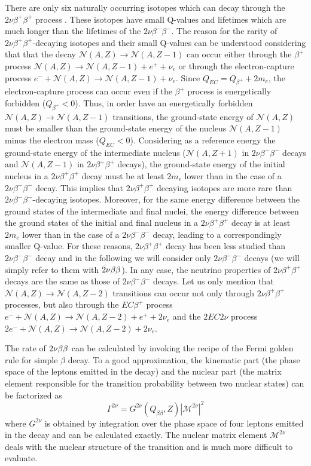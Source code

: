 There are only six naturally occurring isotopes which can decay through the $2\nu\beta^+\beta^+$ process \cite{Haxton:1985am}. These isotopes have small Q-values and lifetimes which are much longer than the lifetimes of the $2\nu\beta^-\beta^-$. The reason for the rarity of $2\nu\beta^+\beta^+$-decaying isotopes and their small Q-values can be understood considering that that the decay $\mathcal{N}(A,Z)\rightarrow\mathcal{N}(A,Z-1)$ can occur either through the $\beta^+$ process $\mathcal{N}(A,Z)\rightarrow\mathcal{N}(A,Z-1)+e^++\nu_e$ or through the electron-capture process $e^-+\mathcal{N}(A,Z)\rightarrow\mathcal{N}(A,Z-1)+\nu_e$. Since $Q_{EC} = Q_{\beta^+}+2m_e$, the electron-capture process can occur even if the $\beta^+$ process is energetically forbidden ($Q_{\beta^+}<0$). Thus, in order have an energetically forbidden $\mathcal{N}(A,Z)\rightarrow\mathcal{N}(A,Z-1)$ transitions, the ground-state energy of $\mathcal{N}(A,Z)$ must be smaller than the ground-state energy of the nucleus $\mathcal{N}(A,Z-1)$ minus the electron mass ($Q_{EC}<0$). Considering as a reference energy the ground-state energy of the intermediate nucleus ($\mathcal{N}(A,Z+1)$ in $2\nu\beta^-\beta^-$ decays and $\mathcal{N}(A,Z-1)$ in $2\nu\beta^+\beta^+$ decays), the ground-state energy of the initial nucleus in a $2\nu\beta^+\beta^+$ decay must be at least $2m_e$ lower than in the case of a $2\nu\beta^-\beta^-$ decay. This implies that $2\nu\beta^+\beta^+$ decaying isotopes are more rare than $2\nu\beta^-\beta^-$-decaying isotopes. Moreover, for the same energy difference between the ground states of the intermediate and final nuclei, the energy difference between the ground states of the initial and final nucleus in a $2\nu\beta^+\beta^+$ decay is at least $2m_e$ lower than in the case of a $2\nu\beta^-\beta^-$ decay, leading to a correspondingly smaller Q-value. For these reasons, $2\nu\beta^+\beta^+$ decay has been less studied than $2\nu\beta^-\beta^-$ decay and in the following we will consider only $2\nu\beta^-\beta^-$ decays (we will simply refer to them with $2\nu\beta\beta$). In any case, the neutrino properties of $2\nu\beta^+\beta^+$ decays are the same as those of $2\nu\beta^-\beta^-$ decays. Let us only mention that $\mathcal{N}(A,Z)\rightarrow\mathcal{N}(A,Z-2)$ transitions can occur not only through $2\nu\beta^+\beta^+$ processes, but also through the $EC\beta^+$ process $e^-+\mathcal{N}(A,Z)\rightarrow\mathcal{N}(A,Z-2)+e^++2\nu_e$ and the $2EC2\nu$ process $2e^-+\mathcal{N}(A,Z)\rightarrow\mathcal{N}(A,Z-2)+2\nu_e$.

The rate of $2\nu\beta\beta$ can be calculated by invoking the recipe of the Fermi golden rule for simple $\beta$ decay. To a good approximation, the kinematic part (the phase space of the leptons emitted in the decay) and the nuclear part (the matrix element responsible for the transition probability between two nuclear states) can be factorized as
\[\Gamma^{2\nu}=G^{2\nu}(Q_{\beta\beta},Z)|\mathcal{M}^{2\nu}|^2\]
where $G^{2\nu}$ is obtained by integration over the phase space of four leptons emitted in the decay and can be calculated exactly. The nuclear matrix element $\mathcal{M}^{2\nu}$ deals with the nuclear structure of the transition and is much more difficult to evaluate. 


